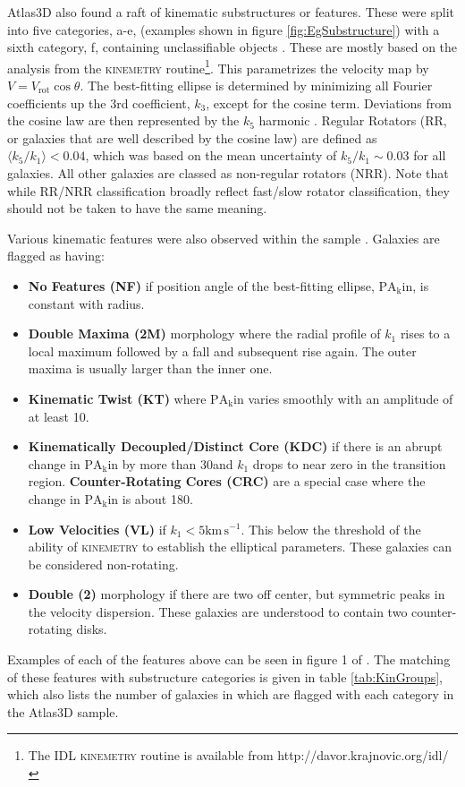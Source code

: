 	Atlas3D also found a raft of kinematic substructures or features. These were split into five categories, a-e, (examples shown in figure \ref{fig:EgSubstructure}) with a sixth category, f, containing unclassifiable objects \citep{Krajnovic2011}. These are mostly based on the analysis from the \textsc{kinemetry} routine\footnote{The IDL \textsc{kinemetry} routine is available from http://davor.krajnovic.org/idl/}. This parametrizes the velocity map by $V = V_\text{rot} \cos \theta$. The best-fitting ellipse is determined by minimizing all Fourier coefficients up the 3rd coefficient, $k_3$, except for the cosine term. Deviations from the cosine law are then represented by the $k_5$ harmonic \citep{Krajnovic2006}. Regular Rotators (RR, or galaxies that are well described by the cosine law) are defined as $\langle k_5/k_1 \rangle < 0.04$, which was based on the mean uncertainty of $k_5/k_1 \sim 0.03$ for all galaxies. All other galaxies are classed as non-regular rotators (NRR). Note that while RR/NRR classification broadly reflect fast/slow rotator classification, they should not be taken to have the same meaning. 

	Various kinematic features were also observed within the sample \citep{Krajnovic2011}. Galaxies are flagged as having:
	\begin{itemize}
		\item \textbf{No Features (NF)} if position angle of the best-fitting ellipse, $\mathrm{PA_kin}$, is constant with radius.
		\item \textbf{Double Maxima (2M)} morphology where the radial profile of $k_1$ rises to a local maximum followed by a fall and subsequent rise again. The outer maxima is usually larger than the inner one. 
		\item \textbf{Kinematic Twist (KT)} where $\mathrm{PA_kin}$ varies smoothly with an amplitude of at least 10\textdegrees. 
		\item \textbf{Kinematically Decoupled/Distinct Core (KDC)} if there is an abrupt change in $\mathrm{PA_kin}$ by more than 30\textdegree and $k_1$ drops to near zero in the transition region. \textbf{Counter-Rotating Cores (CRC)} are a special case where the change in $\mathrm{PA_kin}$ is about 180\textdegree.
		\item \textbf{Low Velocities (VL)} if $k_1 < 5 \mathrm{km \, s^{-1}}$. This below the threshold of the ability of \textsc{kinemetry} to establish the elliptical parameters. These galaxies can be considered non-rotating.
		\item \textbf{Double \textsigma (2\textsigma)} morphology if there are two off center, but symmetric peaks in the velocity dispersion. These galaxies are understood to contain two counter-rotating disks. 
	\end{itemize}
	Examples of each of the features above can be seen in figure 1 of \citet{Krajnovic2011}. The matching of these features with substructure categories is given in table \ref{tab:KinGroups}, which also lists the number of galaxies in which are flagged with each category in the Atlas3D sample. 

